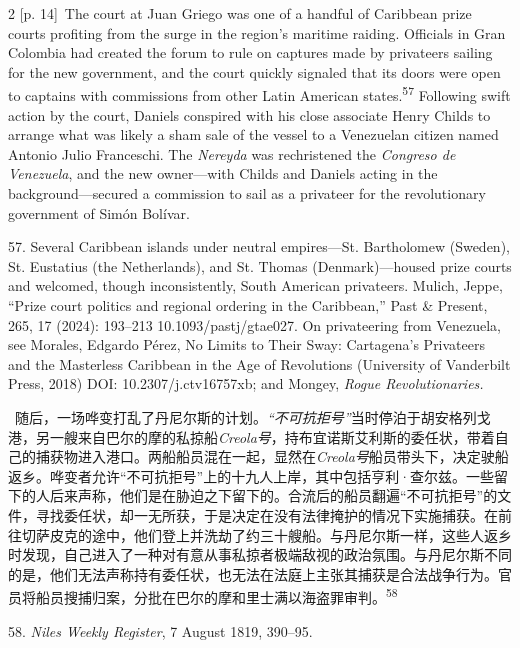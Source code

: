 \documentclass[10pt,a4paper]{article}
\begin{document}
\begin{paracol}{2}
{\scriptsize\color{gray} [p. 14]}\ The court at Juan Griego was one of a handful of Caribbean prize courts profiting from the surge in the region’s maritime raiding. Officials in Gran Colombia had created the forum to rule on captures made by privateers sailing for the new government, and the court quickly signaled that its doors were open to captains with commissions from other Latin American states.\nobreak\textsuperscript{57} Following swift action by the court, Daniels conspired with his close associate Henry Childs to arrange what was likely a sham sale of the vessel to a Venezuelan citizen named Antonio Julio Franceschi. The \textit{Nereyda} was rechristened the \textit{Congreso de Venezuela}, and the new owner—with Childs and Daniels acting in the background—secured a commission to sail as a privateer for the revolutionary government of Simón Bolívar.\par{\small 57. Several Caribbean islands under neutral empires—St. Bartholomew (Sweden), St. Eustatius (the Netherlands), and St. Thomas (Denmark)—housed prize courts and welcomed, though inconsistently, South American privateers. Mulich, Jeppe, “Prize court politics and regional ordering in the Caribbean,” Past \& Present, 265, 17 (2024): 193–213 10.1093/pastj/gtae027. On privateering from Venezuela, see Morales, Edgardo Pérez, No Limits to Their Sway: Cartagena’s Privateers and the Masterless Caribbean in the Age of Revolutions (University of Vanderbilt Press, 2018) DOI: 10.2307/j.ctv16757xb; and Mongey, \textit{Rogue Revolutionaries.}\par}
\switchcolumn*
{\scriptsize\color{gray} [p. 14]}\ 随后，一场哗变打乱了丹尼尔斯的计划。\textit{“不可抗拒号”}当时停泊于胡安格列戈港，另一艘来自巴尔的摩的私掠船\textit{Creola号}，持布宜诺斯艾利斯的委任状，带着自己的捕获物进入港口。两船船员混在一起，显然在\textit{Creola号}船员带头下，决定驶船返乡。哗变者允许“不可抗拒号”上的十九人上岸，其中包括亨利·查尔兹。一些留下的人后来声称，他们是在胁迫之下留下的。合流后的船员翻遍“不可抗拒号”的文件，寻找委任状，却一无所获，于是决定在没有法律掩护的情况下实施捕获。在前往切萨皮克的途中，他们登上并洗劫了约三十艘船。与丹尼尔斯一样，这些人返乡时发现，自己进入了一种对有意从事私掠者极端敌视的政治氛围。与丹尼尔斯不同的是，他们无法声称持有委任状，也无法在法庭上主张其捕获是合法战争行为。官员将船员搜捕归案，分批在巴尔的摩和里士满以海盗罪审\mbox{判。\textsuperscript{58}}\par{\small 58. \textit{Niles Weekly Register}, 7 August 1819, 390–95.\par}
\switchcolumn

\end{paracol}
\end{document}
